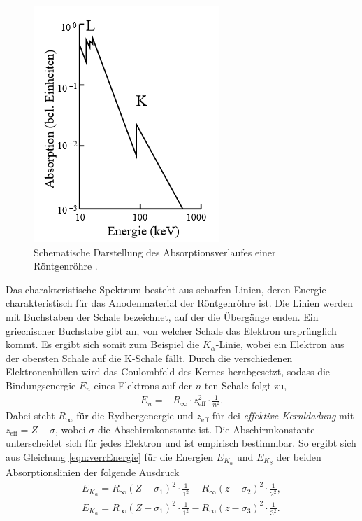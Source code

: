 \begin{figure}[H]
    \centering
    \includegraphics[width = 0.4 \textwidth]{data/absorptionsspektrum.png}
    \caption{Schematische Darstellung des Absorptionsverlaufes einer Röntgenröhre \cite{Anleitung602}.}
    \label{fig:absorptionsverlauf}
\end{figure}
Das charakteristische Spektrum besteht aus scharfen Linien, deren Energie charakteristisch für das Anodenmaterial der Röntgenröhre ist. Die Linien werden mit Buchstaben der Schale bezeichnet, auf der die Übergänge
enden. Ein griechischer Buchstabe gibt an, von welcher Schale das Elektron ursprünglich kommt. Es ergibt sich somit zum Beispiel die $K_\alpha$-Linie, wobei ein Elektron aus der obersten Schale auf die K-Schale fällt. \newline
Durch die verschiedenen Elektronenhüllen wird das Coulombfeld des Kernes herabgesetzt, sodass die Bindungsenergie $E_n$ eines Elektrons auf der $n$-ten Schale folgt zu,
\begin{align}
    \label{eqn:verrEnergie}
    E_n = -R_\infty\cdot z_{\text{eff}}^2\cdot \frac{1}{n^2}.
\end{align}
Dabei steht $R_\infty$ für die Rydbergenergie und $z_{\text{eff}}$ für dei \textit{effektive Kernldadung} mit $z_{\text{eff}} = Z - \sigma$, wobei $\sigma$ die Abschirmkonstante ist.
Die Abschirmkonstante unterscheidet sich für jedes Elektron und ist empirisch bestimmbar. So ergibt sich aus Gleichung \eqref{eqn:verrEnergie} für die Energien $E_{K_\alpha}$ und $E_{K_\beta}$ der beiden Absorptionslinien 
der folgende Ausdruck
\begin{align}
    \label{eqn:ersteEnergie}
    E_{K_\alpha} = R_\infty (Z-\sigma_1)^2\cdot \frac{1}{1^2} - R_\infty (z-\sigma_2)^2 \cdot \frac{1}{2^2}, \\
    \label{eqn:zweiteEnergie}
    E_{K_\alpha} = R_\infty (Z-\sigma_1)^2\cdot \frac{1}{1^2} - R_\infty (z-\sigma_3)^2 \cdot \frac{1}{3^2}. 
\end{align}
